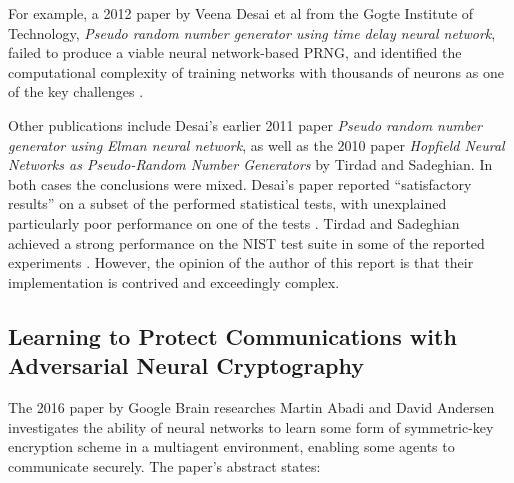 \documentclass[12pt, titlepage]{report}
\theoremstyle{definition}
\begin{document}
For example, a 2012 paper by Veena Desai et al from the Gogte Institute of Technology, \textit{Pseudo random number generator using time delay neural network}, failed to produce a viable neural network-based PRNG, and identified the computational complexity of training networks with thousands of neurons as one of the key challenges \cite{desai2012pseudo}.

Other publications include Desai's earlier 2011 paper \textit{Pseudo random number generator using Elman neural network}, as well as the 2010 paper \textit{Hopfield Neural Networks as Pseudo-Random Number Generators} by Tirdad and Sadeghian. In both cases the conclusions were mixed. Desai's paper reported ``satisfactory results'' on a subset of the performed statistical tests, with unexplained particularly poor performance on one of the tests \cite{desai2011pseudo}. Tirdad and Sadeghian achieved a strong performance on the NIST test suite in some of the reported experiments \cite{tirdad2010hopfield}. However, the opinion of the author of this report is that their implementation is contrived and exceedingly complex. 


\subsection{Learning to Protect Communications with Adversarial Neural Cryptography}
The 2016 paper by Google Brain researches Martin Abadi and David Andersen investigates the ability of neural networks to learn some form of symmetric-key encryption scheme in a multiagent environment, enabling some agents to communicate securely. The paper's abstract states:

 \cite{abadi2016learning}
\end{document}
